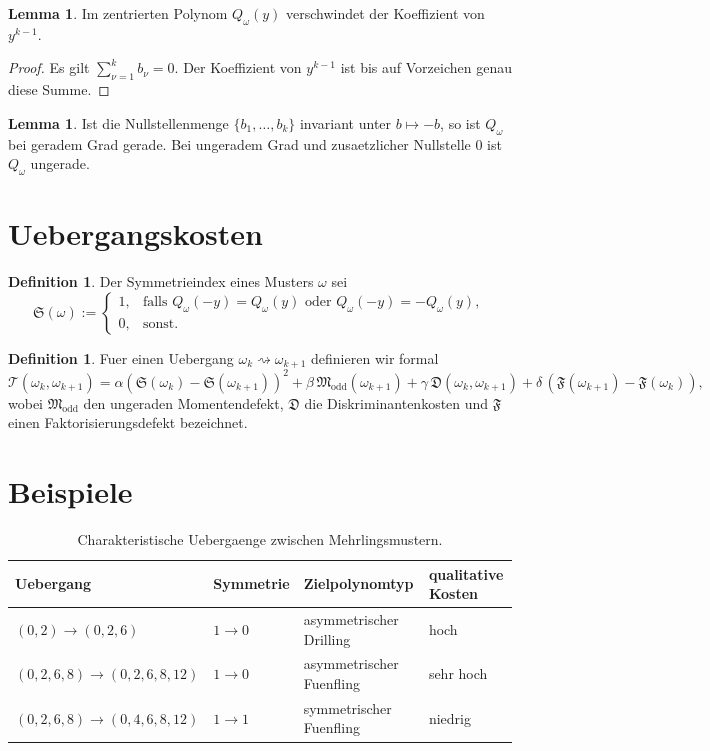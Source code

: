 \documentclass[11pt,a4paper]{article}
\theoremstyle{definition}
\newtheorem{lemma}[satz]{Lemma}
\newtheorem{definition}[satz]{Definition}
\begin{document}
\begin{lemma}
Im zentrierten Polynom \(Q_\omega(y)\) verschwindet der Koeffizient von \(y^{k-1}\).
\end{lemma}

\begin{proof}
Es gilt \(\sum_{\nu=1}^k b_\nu=0\). Der Koeffizient von \(y^{k-1}\) ist bis auf Vorzeichen genau diese Summe.
\end{proof}

\begin{lemma}
Ist die Nullstellenmenge \(\{b_1,\dots,b_k\}\) invariant unter \(b\mapsto -b\), so ist \(Q_\omega\) bei geradem Grad gerade. Bei ungeradem Grad und zusaetzlicher Nullstelle \(0\) ist \(Q_\omega\) ungerade.
\end{lemma}

\section{Uebergangskosten}

\begin{definition}
Der Symmetrieindex eines Musters \(\omega\) sei
\[
\mathfrak S(\omega):=
\begin{cases}
1,& \text{falls } Q_\omega(-y)=Q_\omega(y)\text{ oder }Q_\omega(-y)=-Q_\omega(y),\\
0,& \text{sonst.}
\end{cases}
\]
\end{definition}

\begin{definition}
Fuer einen Uebergang \(\omega_k\rightsquigarrow\omega_{k+1}\) definieren wir formal
\[
\mathcal T(\omega_k,\omega_{k+1})
=
\alpha(\mathfrak S(\omega_k)-\mathfrak S(\omega_{k+1}))^2
+\beta\,\mathfrak M_{\mathrm{odd}}(\omega_{k+1})
+\gamma\,\mathfrak D(\omega_k,\omega_{k+1})
+\delta\,(\mathfrak F(\omega_{k+1})-\mathfrak F(\omega_k)),
\]
wobei \(\mathfrak M_{\mathrm{odd}}\) den ungeraden Momentendefekt, \(\mathfrak D\) die Diskriminantenkosten und \(\mathfrak F\) einen Faktorisierungsdefekt bezeichnet.
\end{definition}

\section{Beispiele}

\begin{table}[h]
\centering
\begin{tabular}{llll}
\toprule
Uebergang & Symmetrie & Zielpolynomtyp & qualitative Kosten \\
\midrule
\((0,2)\to(0,2,6)\) & \(1\to 0\) & asymmetrischer Drilling & hoch \\
\((0,2,6,8)\to(0,2,6,8,12)\) & \(1\to 0\) & asymmetrischer Fuenfling & sehr hoch \\
\((0,2,6,8)\to(0,4,6,8,12)\) & \(1\to 1\) & symmetrischer Fuenfling & niedrig \\
\bottomrule
\end{tabular}
\caption{Charakteristische Uebergaenge zwischen Mehrlingsmustern.}
\end{table}
\end{document}
